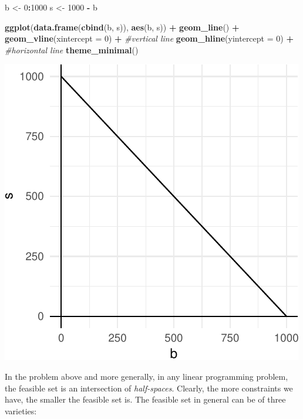 \documentclass[11pt,]{article}
\newenvironment{Shaded}{\begin{snugshade}}{\end{snugshade}}
\newcommand{\KeywordTok}[1]{\textcolor[rgb]{0.13,0.29,0.53}{\textbf{#1}}}
\newcommand{\DataTypeTok}[1]{\textcolor[rgb]{0.13,0.29,0.53}{#1}}
\newcommand{\DecValTok}[1]{\textcolor[rgb]{0.00,0.00,0.81}{#1}}
\newcommand{\StringTok}[1]{\textcolor[rgb]{0.31,0.60,0.02}{#1}}
\newcommand{\CommentTok}[1]{\textcolor[rgb]{0.56,0.35,0.01}{\textit{#1}}}
\newcommand{\OperatorTok}[1]{\textcolor[rgb]{0.81,0.36,0.00}{\textbf{#1}}}
\newcommand{\NormalTok}[1]{#1}
\begin{document}
\begin{Shaded}
\begin{Highlighting}[]
\NormalTok{b <-}\StringTok{ }\DecValTok{0}\OperatorTok{:}\DecValTok{1000}
\NormalTok{s <-}\StringTok{ }\DecValTok{1000} \OperatorTok{-}\StringTok{ }\NormalTok{b}

\KeywordTok{ggplot}\NormalTok{(}\KeywordTok{data.frame}\NormalTok{(}\KeywordTok{cbind}\NormalTok{(b, s)), }\KeywordTok{aes}\NormalTok{(b, s)) }\OperatorTok{+}
\StringTok{  }\KeywordTok{geom_line}\NormalTok{() }\OperatorTok{+}
\StringTok{  }\KeywordTok{geom_vline}\NormalTok{(}\DataTypeTok{xintercept =} \DecValTok{0}\NormalTok{) }\OperatorTok{+}\StringTok{ }\CommentTok{#vertical line}
\StringTok{  }\KeywordTok{geom_hline}\NormalTok{(}\DataTypeTok{yintercept =} \DecValTok{0}\NormalTok{) }\OperatorTok{+}\StringTok{ }\CommentTok{#horizontal line}
\StringTok{  }\KeywordTok{theme_minimal}\NormalTok{()}
\end{Highlighting}
\end{Shaded}

\begin{center}\includegraphics{Linear_Programming_files/figure-latex/plot_feasible-1} \end{center}

In the problem above and more generally, in any linear programming
problem, the feasible set is an intersection of \emph{half-spaces}.
Clearly, the more constraints we have, the smaller the feasible set is.
The feasible set in general can be of three varieties:
\end{document}
